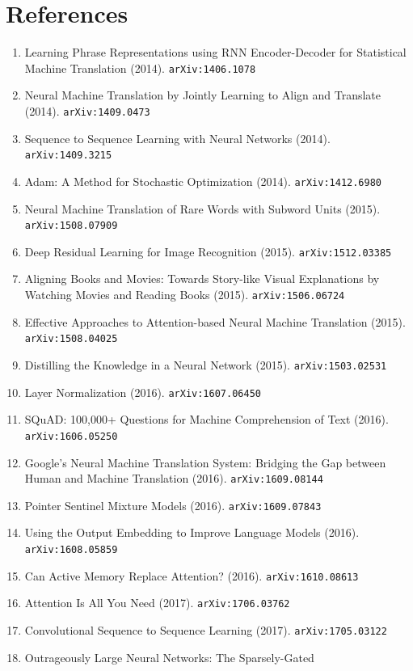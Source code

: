 \documentclass[11pt]{article}
\begin{document}
\section*{References}
\begin{enumerate}\small
  \item Learning Phrase Representations using RNN Encoder-Decoder for
  Statistical Machine Translation (2014). \texttt{arXiv:1406.1078}
  \item Neural Machine Translation by Jointly Learning to Align and Translate (2014). \texttt{arXiv:1409.0473}
  \item Sequence to Sequence Learning with Neural Networks (2014). \texttt{arXiv:1409.3215}
  \item Adam: A Method for Stochastic Optimization (2014). \texttt{arXiv:1412.6980}
  \item Neural Machine Translation of Rare Words with Subword Units (2015). \texttt{arXiv:1508.07909}
  \item Deep Residual Learning for Image Recognition (2015). \texttt{arXiv:1512.03385}
  \item Aligning Books and Movies: Towards Story-like Visual Explanations by
  Watching Movies and Reading Books (2015). \texttt{arXiv:1506.06724}
  \item Effective Approaches to Attention-based Neural Machine Translation (2015). \texttt{arXiv:1508.04025}
  \item Distilling the Knowledge in a Neural Network (2015). \texttt{arXiv:1503.02531}
  \item Layer Normalization (2016). \texttt{arXiv:1607.06450}
  \item SQuAD: 100,000+ Questions for Machine Comprehension of Text (2016). \texttt{arXiv:1606.05250}
  \item Google's Neural Machine Translation System: Bridging the Gap between
  Human and Machine Translation (2016). \texttt{arXiv:1609.08144}
  \item Pointer Sentinel Mixture Models (2016). \texttt{arXiv:1609.07843}
  \item Using the Output Embedding to Improve Language Models (2016). \texttt{arXiv:1608.05859}
  \item Can Active Memory Replace Attention? (2016). \texttt{arXiv:1610.08613}
  \item Attention Is All You Need (2017). \texttt{arXiv:1706.03762}
  \item Convolutional Sequence to Sequence Learning (2017). \texttt{arXiv:1705.03122}
  \item Outrageously Large Neural Networks: The Sparsely-Gated

\end{enumerate}
\end{document}

